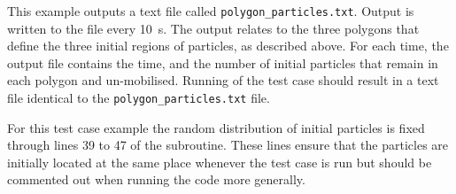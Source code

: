 \smallskip
This example outputs a text file called \verb!polygon_particles.txt!.
Output is written to the file every 10~s.
The output relates to the three polygons that define the three initial regions
of particles, as described above.  
For each time, the output file contains the time, and the number of initial
particles that remain in each polygon and un-mobilised.
Running of the test case should result in a text file identical to the
\verb!polygon_particles.txt! file.

\smallskip
For this test case example the random distribution of initial particles is fixed
through lines 39 to 47 of the  subroutine.
These lines ensure that the particles are initially located at the same place
whenever the test case is run but should be commented out when running the code
more generally.  
